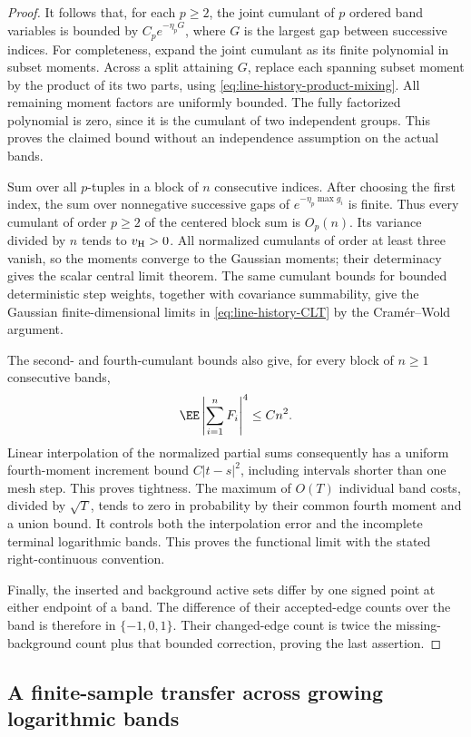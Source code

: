 \documentclass[11pt,letterpaper]{article}
\begin{document}
\begin{proof}
It follows that, for each $p\ge2$, the joint cumulant of $p$ ordered
band variables is bounded by
$C_p e^{-\eta_p G}$, where $G$ is the largest gap between successive
indices. For completeness, expand the joint cumulant as its finite
polynomial in subset moments. Across a split attaining $G$, replace
each spanning subset moment by the product of its two parts, using
\eqref{eq:line-history-product-mixing}. All remaining moment factors
are uniformly bounded. The fully factorized polynomial is zero,
since it is the cumulant of two independent groups. This proves
the claimed bound without an independence assumption on the actual
bands.

Sum over all $p$-tuples in a block of $n$ consecutive indices.
After choosing the first index, the sum over nonnegative successive
gaps of $e^{-\eta_p\max g_i}$ is finite. Thus every cumulant of
order $p\ge2$ of the centered block sum is $O_p(n)$.
Its variance divided by $n$ tends to $v_{\rm H}>0$.
All normalized cumulants of order at least three vanish, so the
moments converge to the Gaussian moments; their determinacy gives
the scalar central limit theorem. The same cumulant bounds for
bounded deterministic step weights, together with covariance
summability, give the Gaussian finite-dimensional limits in
\eqref{eq:line-history-CLT} by the Cram\'er--Wold argument.

The second- and fourth-cumulant bounds also give, for every block
of $n\ge1$ consecutive bands,
\[
 \EE\left|\sum_{i=1}^nF_i\right|^4\le Cn^2.
\]
Linear interpolation of the normalized partial sums consequently
has a uniform fourth-moment increment bound $C|t-s|^2$, including
intervals shorter than one mesh step. This proves tightness.
The maximum of $O(T)$ individual band costs, divided by $\sqrt T$,
tends to zero in probability by their common fourth moment and
a union bound. It controls both the interpolation error and the
incomplete terminal logarithmic bands. This proves the functional
limit with the stated right-continuous convention.

Finally, the inserted and background active sets differ by one
signed point at either endpoint of a band. The difference of their
accepted-edge counts over the band is therefore in $\{-1,0,1\}$.
Their changed-edge count is twice the missing-background count
plus that bounded correction, proving the last assertion.
\end{proof}

\subsection{A finite-sample transfer across growing logarithmic bands}
\label{sec:finite-history-CLT}
\end{document}
